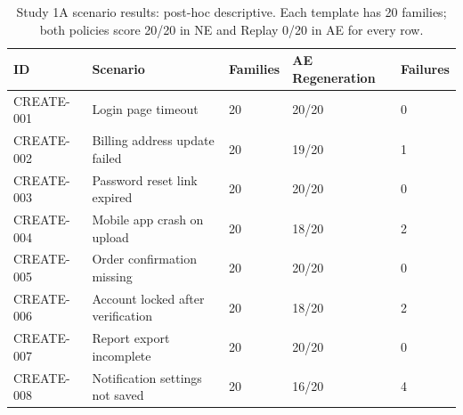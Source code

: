\begin{table}[t]
\centering
\caption{Study 1A scenario results: post-hoc descriptive. Each template has 20 families; both policies score 20/20 in NE and Replay 0/20 in AE for every row.}
\label{tab:s-scenarios}
\begin{tabular}{@{}lllll@{}}
\toprule
ID & Scenario & Families & AE Regeneration & Failures \\
\midrule
CREATE-001 & Login page timeout & 20 & 20/20 & 0 \\
CREATE-002 & Billing address update failed & 20 & 19/20 & 1 \\
CREATE-003 & Password reset link expired & 20 & 20/20 & 0 \\
CREATE-004 & Mobile app crash on upload & 20 & 18/20 & 2 \\
CREATE-005 & Order confirmation missing & 20 & 20/20 & 0 \\
CREATE-006 & Account locked after verification & 20 & 18/20 & 2 \\
CREATE-007 & Report export incomplete & 20 & 20/20 & 0 \\
CREATE-008 & Notification settings not saved & 20 & 16/20 & 4 \\
\bottomrule
\end{tabular}
\end{table}
